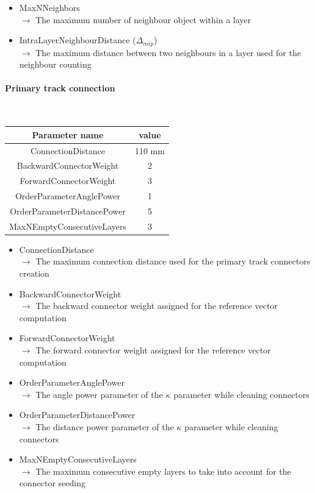 \documentclass[cits]{JINST}
\begin{document}
\begin{itemize}
  \item MaxNNeighbors \\
  $\rightarrow$ The maximum number of neighbour object within a layer
  \item IntraLayerNeighbourDistance ($\Delta_{mip}$) \\
  $\rightarrow$ The maximum distance between two neighbours in a layer used for the neighbour counting
\end{itemize}

\newpage
\paragraph{Primary track connection} ~

\begin{table}[!ht]
  \begin{center}
    \begin{tabu} to \linewidth { c | c } 
          Parameter name & value \\
          \hline
          ConnectionDistance & 110 mm \\ 
          BackwardConnectorWeight & 2 \\ 
          ForwardConnectorWeight & 3 \\ 
          OrderParameterAnglePower & 1 \\ 
          OrderParameterDistancePower & 5 \\
          MaxNEmptyConsecutiveLayers & 3 
    \end{tabu} 
  \end{center}
\end{table}

\begin{itemize}
  \item ConnectionDistance \\
  $\rightarrow$ The maximum connection distance used for the primary track connectors creation
  \item BackwardConnectorWeight \\
  $\rightarrow$ The backward connector weight assigned for the reference vector computation
  \item ForwardConnectorWeight \\
  $\rightarrow$ The forward connector weight assigned for the reference vector computation
  \item OrderParameterAnglePower \\ 
  $\rightarrow$ The angle power parameter of the $\kappa$ parameter while cleaning connectors
  \item OrderParameterDistancePower \\
  $\rightarrow$ The distance power parameter of the $\kappa$ parameter while cleaning connectors
  \item MaxNEmptyConsecutiveLayers \\
  $\rightarrow$ The maximum consecutive empty layers to take into account for the connector seeding
\end{itemize}
\end{document}
